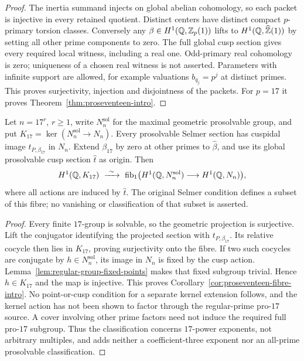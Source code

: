 \begin{proof}
The inertia summand injects on global abelian cohomology, so each
packet is injective in every retained quotient. Distinct centers
have distinct compact $p$-primary torsion classes.
Conversely any $\beta\in H^1(\mathbb Q,\mathbb Z_p(1))$ lifts to
$H^1(\mathbb Q,\widehat{\mathbb Z}(1))$ by setting all other prime components to zero.
The full global cusp section gives every required local witness,
including a real one. Odd-primary real cohomology is zero;
uniqueness of a chosen real witness is not asserted.
Parameters with infinite support are allowed, for example
valuations $b_{q_j}=p^j$ at distinct primes.
This proves surjectivity, injection and disjointness of the packets.
For $p=17$ it proves Theorem~\ref{thm:proseventeen-intro}.
\end{proof}

\begin{corollary}
\label{cor:proseventeen-kernel-fibre}
Let $n=17^r$, $r\ge1$, write $N_n^{\mathrm{sol}}$ for the
maximal geometric prosolvable group, and put
$K_{17}=\ker(N_n^{\mathrm{sol}}\to N_n)$.
Every prosolvable Selmer section has cuspidal image
$t_{P,\beta_{17}}$ in $N_n$.
Extend $\beta_{17}$ by zero at other primes to $\widehat\beta$,
and use its global prosolvable cusp section $\widehat t$ as origin.
Then
\[
 H^1(\Q,K_{17})\ \xrightarrow{\ \sim\ }\
 \operatorname{fib}_{1}\bigl(H^1(\Q,N_n^{\mathrm{sol}})
                    \longrightarrow H^1(\Q,N_n)\bigr),
\]
where all actions are induced by $\widehat t$.
The original Selmer condition defines a subset of this fibre;
no vanishing or classification of that subset is asserted.
\end{corollary}
\begin{proof}
Every finite $17$-group is solvable, so the geometric projection
is surjective. Lift the conjugator identifying the projected
section with $t_{P,\beta_{17}}$. Its relative cocycle then lies
in $K_{17}$, proving surjectivity onto the fibre.
If two such cocycles are conjugate by $h\in N_n^{\mathrm{sol}}$,
its image in $N_n$ is fixed by the cusp action.
Lemma~\ref{lem:regular-group-fixed-points} makes that fixed subgroup
trivial. Hence $h\in K_{17}$ and the map is injective.
This proves Corollary~\ref{cor:proseventeen-fibre-intro}.
No point-or-cusp condition for a separate kernel extension follows,
and the kernel action has not been shown to factor through the
regular-prime pro-$17$ source. A cover involving other prime factors
need not induce the required full pro-$17$ subgroup. Thus the
classification concerns $17$-power exponents, not arbitrary multiples,
and adds neither a coefficient-three exponent nor an all-prime
prosolvable classification.
\end{proof}
